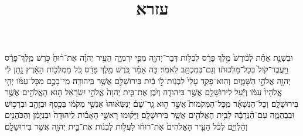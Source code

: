 \documentclass{openreader}
\title{עזרא}
\date{}
\begin{document}
\maketitle
\raggedbottom 
\fontsize{16pt}{24pt}\selectfont


וּבִשְׁנַ֣ת אַחַ֗ת לְכֹ֨ורֶשׁ֙ מֶ֣לֶךְ פָּרַ֔ס לִכְלֹ֥ות דְּבַר־יְהוָ֖ה מִפִּ֣י יִרְמְיָ֑ה הֵעִ֣יר יְהוָ֗ה אֶת־ר֨וּחַ֙ כֹּ֣רֶשׁ מֶֽלֶךְ־פָּרַ֔ס וַיַּֽעֲבֶר־קֹול֙ בְּכָל־מַלְכוּתֹ֔ו וְגַם־בְּמִכְתָּ֖ב לֵאמֹֽר׃ 
כֹּ֣ה אָמַ֗ר כֹּ֚רֶשׁ מֶ֣לֶךְ פָּרַ֔ס כֹּ֚ל מַמְלְכֹ֣ות הָאָ֔רֶץ נָ֣תַן לִ֔י יְהוָ֖ה אֱלֹהֵ֣י הַשָּׁמָ֑יִם וְהֽוּא־פָקַ֤ד עָלַי֙ לִבְנֹֽות־לֹ֣ו בַ֔יִת בִּירוּשָׁלִַ֖ם אֲשֶׁ֥ר בִּֽיהוּדָֽה׃ 
מִֽי־בָכֶ֣ם מִכָּל־עַמֹּ֗ו יְהִ֤י אֱלֹהָיו֙ עִמֹּ֔ו וְיַ֕עַל לִירוּשָׁלִַ֖ם אֲשֶׁ֣ר בִּיהוּדָ֑ה וְיִ֗בֶן אֶת־בֵּ֤ית יְהוָה֙ אֱלֹהֵ֣י יִשְׂרָאֵ֔ל ה֥וּא הָאֱלֹהִ֖ים אֲשֶׁ֥ר בִּירוּשָׁלִָֽם׃ 
וְכָל־הַנִּשְׁאָ֗ר מִֽכָּל־הַמְּקֹמֹות֮ אֲשֶׁ֣ר ה֣וּא גָֽר־שָׁם֒ יְנַשְּׂא֨וּהוּ֙ אַנְשֵׁ֣י מְקֹמֹ֔ו בְּכֶ֥סֶף וּבְזָהָ֖ב וּבִרְכ֣וּשׁ וּבִבְהֵמָ֑ה עִם־הַ֨נְּדָבָ֔ה לְבֵ֥ית הָאֱלֹהִ֖ים אֲשֶׁ֥ר בִּירוּשָׁלִָֽם׃ 
וַיָּק֜וּמוּ רָאשֵׁ֣י הָאָבֹ֗ות לִֽיהוּדָה֙ וּבִנְיָמִ֔ן וְהַכֹּהֲנִ֖ים וְהַלְוִיִּ֑ם לְכֹ֨ל הֵעִ֤יר הָאֱלֹהִים֙ אֶת־רוּחֹ֔ו לַעֲלֹ֣ות לִבְנֹ֔ות אֶת־בֵּ֥ית יְהוָ֖ה אֲשֶׁ֥ר בִּירוּשָׁלִָֽם׃ 
\end{document}

